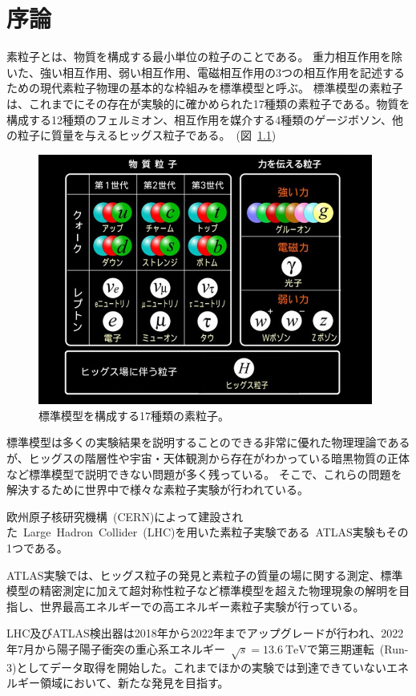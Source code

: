 \chapter{序論}
素粒子とは、物質を構成する最小単位の粒子のことである。
重力相互作用を除いた、強い相互作用、弱い相互作用、電磁相互作用の3つの相互作用を記述するための現代素粒子物理の基本的な枠組みを標準模型と呼ぶ。
標準模型の素粒子は、これまでにその存在が実験的に確かめられた17種類の素粒子である。物質を構成する12種類のフェルミオン、相互作用を媒介する4種類のゲージボソン、他の粒子に質量を与えるヒッグス粒子である。~(図~\ref{fig:1-1})

\begin{figure}[H]
  \centering
  \includegraphics[clip, width=11cm]{fig/1/standardmodel_v2.jpg}
  \caption{標準模型を構成する17種類の素粒子。\cite{article:ATLAS_japan}}
  \label{fig:1-1}
\end{figure}

\newpage

標準模型は多くの実験結果を説明することのできる非常に優れた物理理論であるが、ヒッグスの階層性や宇宙・天体観測から存在がわかっている暗黒物質の正体など標準模型で説明できない問題が多く残っている。
そこで、これらの問題を解決するために世界中で様々な素粒子実験が行われている。

欧州原子核研究機構~(CERN)\cite{article:CERN}によって建設された~Large~Hadron~Collider~(LHC)\cite{article:LHC}を用いた素粒子実験である~ATLAS実験\cite{article:ATLAS}もその1つである。

ATLAS実験では、ヒッグス粒子の発見と素粒子の質量の場に関する測定、標準模型の精密測定に加えて超対称性粒子など標準模型を超えた物理現象の解明を目指し、世界最高エネルギーでの高エネルギー素粒子実験が行っている。

LHC及びATLAS検出器は2018年から2022年までアップグレードが行われ、2022年7月から陽子陽子衝突の重心系エネルギー~$\sqrt{s}=\SI{13.6}{\TeV}$で第三期運転~(Run-3)としてデータ取得を開始した。これまでほかの実験では到達できていないエネルギー領域において、新たな発見を目指す。